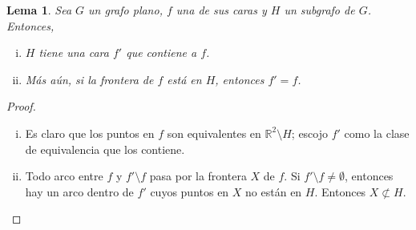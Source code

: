 \documentclass[12pt]{report}
\theoremstyle{plain}
\newtheorem{lemma}[theorem]{Lema}
\theoremstyle{definition}
\newcommand{\reals}{\mathbb{R}}
\begin{document}
\begin{lemma}\label{lema:clase 18 05 23 - lema 1}
Sea $G$ un grafo plano, $f$ una de sus caras y $H$ un subgrafo de $G$. Entonces,
\begin{enumerate}[(i)]
\item $H$ tiene una cara $f'$ que contiene a $f$.
\item Más aún, si la frontera de $f$ está en $H$, entonces $f' = f$.
\end{enumerate}
\end{lemma}


\begin{proof}
\begin{enumerate}[(i)]
\item Es claro que los puntos en $f$ son equivalentes en $\reals^2 \setminus H$; escojo $f'$ como la clase de equivalencia que los contiene.
\item Todo arco entre $f$ y $f' \setminus f$ pasa por la frontera $X$ de $f$. Si $f' \setminus f \neq \emptyset$, entonces hay un arco dentro de $f'$ cuyos puntos en $X$ no están en $H$. Entonces $X \not \subset H$.
\end{enumerate}
\end{proof}
\end{document}
